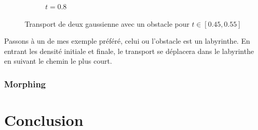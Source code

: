 \documentclass[a4paper,12pt]{article}
\begin{document}
\begin{figure}
\begin{subfigure}[b]{0.18\linewidth}
\caption{$t=0.8$}
\end{subfigure}

\caption{Transport de deux gaussienne avec un obstacle pour $t\in[0.45,0.55]$}
\end{figure}

Passons à un de mes exemple préféré, celui ou l'obstacle est un labyrinthe. En entrant les densité initiale et finale, le transport se déplacera dans le labyrinthe en suivant le chemin le plus court. 





\newpage
\subsubsection{Morphing}


\newpage
\section{Conclusion}








\newpage


\newpage
\end{document}
